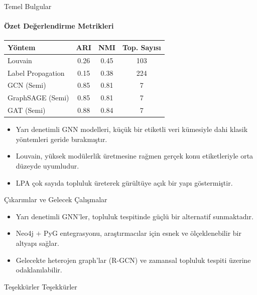 \documentclass{beamer}
\begin{document}
\begin{frame}{Temel Bulgular}
\framesubtitle{Özet Değerlendirme Metrikleri}
    \centering
    \small
    \begin{tabular}{lccc}
        \hline
        Yöntem & ARI & NMI & Top. Sayısı \\\hline
        Louvain & 0.26 & 0.45 & 103 \\
        Label Propagation & 0.15 & 0.38 & 224 \\
        GCN (Semi) & 0.85 & 0.81 & 7 \\
        GraphSAGE (Semi) & 0.85 & 0.81 & 7 \\
        GAT (Semi) & 0.88 & 0.84 & 7 \\
        \hline
    \end{tabular}

    \vspace{0.3cm}
    \begin{itemize}
        \item Yarı denetimli GNN modelleri, küçük bir etiketli veri kümesiyle dahi klasik yöntemleri geride bırakmıştır.
        \item Louvain, yüksek modülerlik üretmesine rağmen gerçek konu etiketleriyle orta düzeyde uyumludur.
        \item LPA çok sayıda topluluk üreterek gürültüye açık bir yapı göstermiştir.
    \end{itemize}
\end{frame}

\begin{frame}{Çıkarımlar ve Gelecek Çalışmalar}
    \begin{itemize}
        \item Yarı denetimli GNN'ler, topluluk tespitinde güçlü bir alternatif sunmaktadır.
        \item Neo4j $+$ PyG entegrasyonu, araştırmacılar için esnek ve ölçeklenebilir bir altyapı sağlar.
        \item Gelecekte heterojen graph'lar (R-GCN) ve zamansal topluluk tespiti üzerine odaklanılabilir.
    \end{itemize}
\end{frame}

\begin{frame}{Teşekkürler}
    \centering
    \Huge
    Teşekkürler
\end{frame}

\end{document}
